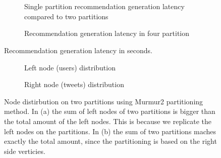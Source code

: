 \chapter{\appendixname}


\begin{figure}[!htb]
    \centering
    \begin{subfigure}{\textwidth}
        \centering
        
        \caption{Single partition recommendation generation latency compared to two partitions}
        \label{plot:recommendation-latency-two-partitions}
    \end{subfigure}\qquad

    \begin{subfigure}{\textwidth}
        \centering
        
        \caption{Recommendation generation latency in four partition}
        \label{plot:recommendation-latency-four-partitions}
    \end{subfigure}\qquad
    \caption{Recommendation generation latency in seconds.}
    \label{plot:recommendation-latency}
\end{figure}

\begin{figure}[!htb]
    \centering
	\begin{subfigure}{\textwidth}
		\centering
		
		\caption{Left node (users) distribution}
		\label{plot:left-node-distribution-murmur2}
    \end{subfigure}\qquad

    \begin{subfigure}{\textwidth}
		\centering
		
		\caption{Right node (tweets) distribution}
		\label{plot:right-node-distribution-murmur2}
    \end{subfigure}\qquad
    
    \caption{Node distirbution on two partitions using Murmur2 partitioning method. In (a) the sum of left nodes of two partitions is bigger than the total amount of the left nodes. This is because we replicate the left nodes on the partitions. In (b) the sum of two partitions maches exactly the total amount, since the partitioning is based on the right side verticies.}
\end{figure}

